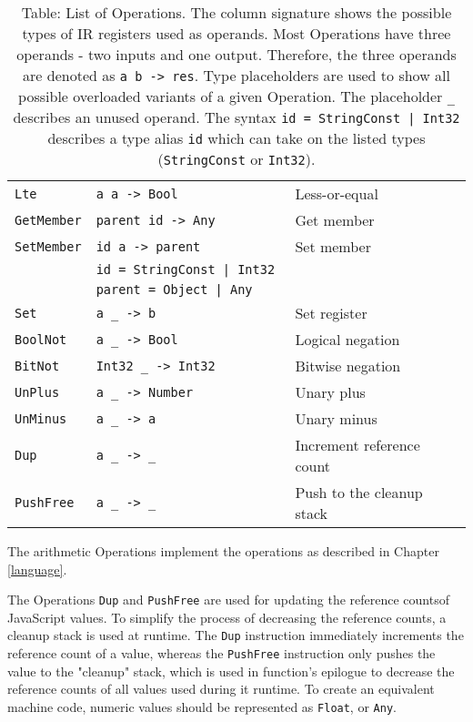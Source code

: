 \begin{table}
\begin{tabular}{l | l | l}
        \texttt{Lte}         & \texttt{a      a     -> Bool     } &  Less-or-equal              \\
        \texttt{GetMember}   & \texttt{parent id    -> Any      } &  Get member                 \\
        \texttt{SetMember}   & \texttt{id     a     -> parent   } &  Set member                 \\
                             & \texttt{id = StringConst | Int32 } &                             \\
                             & \texttt{parent = Object | Any    } &                             \\
        \texttt{Set}         & \texttt{a      \_    -> b        } &  Set register               \\
        \texttt{BoolNot}     & \texttt{a      \_    -> Bool     } &  Logical negation           \\
        \texttt{BitNot}      & \texttt{Int32  \_    -> Int32    } &  Bitwise negation           \\
        \texttt{UnPlus}      & \texttt{a      \_    -> Number   } &  Unary plus                 \\
        \texttt{UnMinus}     & \texttt{a      \_    -> a        } &  Unary minus                \\
        \texttt{Dup}         & \texttt{a      \_    -> \_       } &  Increment reference count  \\
        \texttt{PushFree}    & \texttt{a      \_    -> \_       } &  Push to the cleanup stack          \\
    \end{tabular}
    \caption{Table: List of Operations. The column signature shows the possible types of IR registers used as operands. Most Operations have three operands - two inputs and one output. Therefore, the three operands are denoted as \texttt{a b -> res}. Type placeholders are used to show all possible overloaded variants of a given Operation. The placeholder \texttt{\_} describes an unused operand. The syntax \texttt{id = StringConst | Int32} describes a type alias \texttt{id} which can take on the listed types (\texttt{StringConst} or \texttt{Int32}). }
    \label{tab:opcodes}
\end{table}

The arithmetic Operations implement the operations as described in Chapter \ref{language}.

The Operations \texttt{Dup} and \texttt{PushFree} are used for updating the reference counts\footnotemark[1] of JavaScript values. To simplify the process of decreasing the reference counts, a cleanup stack is used at runtime. The \texttt{Dup} instruction immediately increments the reference count of a value, whereas the \texttt{PushFree} instruction only pushes the value to the "cleanup" stack, which is used in function's epilogue to decrease the reference counts of all values used during it runtime. To create an equivalent machine code, numeric values should be represented as \texttt{Float}, or \texttt{Any}\footnotemark[2].

